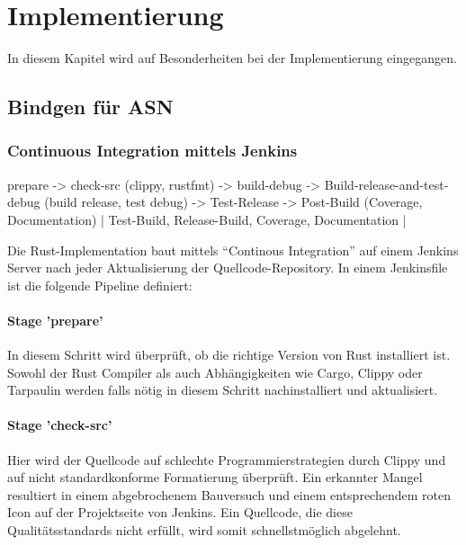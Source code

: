 
\chapter{Implementierung}

In diesem Kapitel wird auf Besonderheiten bei der Implementierung eingegangen.





\section{Bindgen für ASN}

\label{impl:issue:ffi}




\subsection{Continuous Integration mittels Jenkins}

prepare -> check-src (clippy, rustfmt) -> build-debug -> Build-release-and-test-debug (build release, test debug) -> Test-Release -> Post-Build (Coverage, Documentation) | Test-Build, Release-Build, Coverage, Documentation |

Die Rust-Implementation baut mittels \enquote{Continous Integration} auf einem Jenkins Server nach jeder Aktualisierung der Quellcode-Repository.
In einem Jenkinsfile ist die folgende Pipeline definiert:


\subsubsection{Stage 'prepare'}
In diesem Schritt wird überprüft, ob die richtige Version von Rust installiert ist.
Sowohl der Rust Compiler als auch Abhängigkeiten wie Cargo, Clippy oder Tarpaulin werden falls nötig  in diesem Schritt nachinstalliert und aktualisiert.

\subsubsection{Stage 'check-src'}
Hier wird der Quellcode auf schlechte Programmierstrategien durch Clippy und auf nicht standardkonforme Formatierung überprüft.
Ein erkannter Mangel resultiert in einem abgebrochenem Bauversuch und einem entsprechendem roten Icon auf der Projektseite von Jenkins.
Ein Quellcode, die diese Qualitätsstandards nicht erfüllt, wird somit schnellstmöglich abgelehnt.

